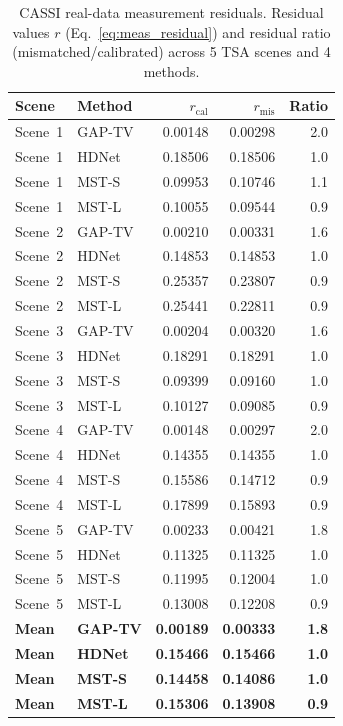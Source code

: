 \documentclass[11pt]{article}
\begin{document}
\begin{table}[htbp]
\centering
\caption{CASSI real-data measurement residuals.
Residual values $r$ (Eq.~\ref{eq:meas_residual}) and residual ratio
(mismatched/calibrated) across 5 TSA scenes and 4 methods.}
\label{tab:cassi_real}
\begin{tabular}{l l r r r}
\toprule
\textbf{Scene} & \textbf{Method} &
  \textbf{$r_{\mathrm{cal}}$} & \textbf{$r_{\mathrm{mis}}$} &
  \textbf{Ratio} \\
\midrule
Scene~1 & GAP-TV  & 0.00148 & 0.00298 & 2.0 \\
Scene~1 & HDNet   & 0.18506 & 0.18506 & 1.0 \\
Scene~1 & MST-S   & 0.09953 & 0.10746 & 1.1 \\
Scene~1 & MST-L   & 0.10055 & 0.09544 & 0.9 \\
\midrule
Scene~2 & GAP-TV  & 0.00210 & 0.00331 & 1.6 \\
Scene~2 & HDNet   & 0.14853 & 0.14853 & 1.0 \\
Scene~2 & MST-S   & 0.25357 & 0.23807 & 0.9 \\
Scene~2 & MST-L   & 0.25441 & 0.22811 & 0.9 \\
\midrule
Scene~3 & GAP-TV  & 0.00204 & 0.00320 & 1.6 \\
Scene~3 & HDNet   & 0.18291 & 0.18291 & 1.0 \\
Scene~3 & MST-S   & 0.09399 & 0.09160 & 1.0 \\
Scene~3 & MST-L   & 0.10127 & 0.09085 & 0.9 \\
\midrule
Scene~4 & GAP-TV  & 0.00148 & 0.00297 & 2.0 \\
Scene~4 & HDNet   & 0.14355 & 0.14355 & 1.0 \\
Scene~4 & MST-S   & 0.15586 & 0.14712 & 0.9 \\
Scene~4 & MST-L   & 0.17899 & 0.15893 & 0.9 \\
\midrule
Scene~5 & GAP-TV  & 0.00233 & 0.00421 & 1.8 \\
Scene~5 & HDNet   & 0.11325 & 0.11325 & 1.0 \\
Scene~5 & MST-S   & 0.11995 & 0.12004 & 1.0 \\
Scene~5 & MST-L   & 0.13008 & 0.12208 & 0.9 \\
\midrule
\textbf{Mean} & \textbf{GAP-TV} & \textbf{0.00189} & \textbf{0.00333} & \textbf{1.8} \\
\textbf{Mean} & \textbf{HDNet}  & \textbf{0.15466} & \textbf{0.15466} & \textbf{1.0} \\
\textbf{Mean} & \textbf{MST-S}  & \textbf{0.14458} & \textbf{0.14086} & \textbf{1.0} \\
\textbf{Mean} & \textbf{MST-L}  & \textbf{0.15306} & \textbf{0.13908} & \textbf{0.9} \\
\bottomrule
\end{tabular}
\end{table}
\end{document}
